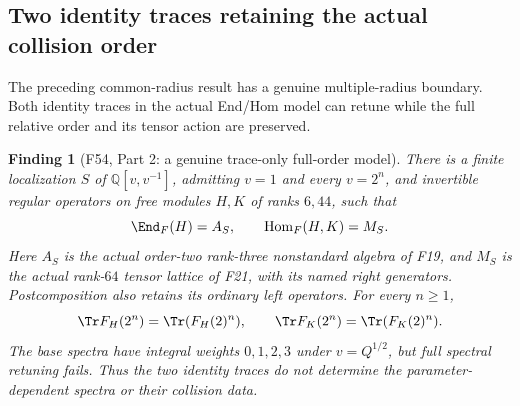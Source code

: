 \documentclass[11pt,a4paper]{article}
\newcommand{\fid}[1]{\textsf{#1}}\newcommand{\gate}[1]{\textsf{#1}}
\theoremstyle{named}\newtheorem{finding}{Finding}[section]
\theoremstyle{definition}\newtheorem{definition}[finding]{Definition}
\theoremstyle{remark}\newtheorem{remark}[finding]{Remark}
\begin{document}
\subsection{Two identity traces retaining the actual collision order}
The preceding common-radius result has a genuine multiple-radius
boundary. Both identity traces in the actual End/Hom model can
retune while the full relative order and its tensor action are
preserved.

\begin{finding}[\fid{F54}, Part 2: a genuine trace-only full-order model]
\label{f:traceonlyactualmodel}
There is a finite localization $S$ of $\mathbb Q[v,v^{-1}]$,
admitting $v=1$ and every $v=2^n$, and invertible regular
operators on free modules $H,K$ of ranks $6,44$, such that
\[
 \End_F(H)=A_S,\qquad \operatorname{Hom}_F(H,K)=M_S.
\]
Here $A_S$ is the actual order-two rank-three nonstandard
algebra of \fid{F19}, and $M_S$ is the actual rank-$64$
tensor lattice of \fid{F21}, with its named right generators.
Postcomposition also retains its ordinary left operators.
For every $n\ge1$,
\begin{equation}\label{eq:twogenuinetraces}
 \Tr F_H(2^n)=\Tr(F_H(2)^n),\qquad
 \Tr F_K(2^n)=\Tr(F_K(2)^n).
\end{equation}
The base spectra have integral weights $0,1,2,3$ under
$v=Q^{1/2}$, but full spectral retuning fails.
Thus the two identity traces do not determine the
parameter-dependent spectra or their collision data.
\end{finding}
\end{document}
